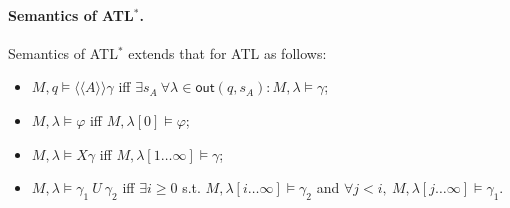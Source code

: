 \paragraph{Semantics of ATL$^\ast$.}
Semantics of ATL$^\ast$ extends that for ATL as follows: 
\begin{itemize}
  \item[-] $M,q \models \langle\!\langle A\rangle\!\rangle \gamma$ iff
        $\exists s_A \ \forall \lambda \in \mathsf{out}(q,s_A):
        M,\lambda \models \gamma$;
  \item[-] $M,\lambda \models \varphi$ iff $M,\lambda[0] \models \varphi$;
  \item[-] $M,\lambda \models X\gamma$ iff
        $M,\lambda[1 \dots \infty] \models \gamma$;
  \item[-] $M,\lambda \models \gamma_1 \ U \ \gamma_2$ iff
        $\exists i \ge 0$ s.t.
        $M,\lambda[i \dots \infty] \models \gamma_2$ and
        $\forall j < i,\ M,\lambda[j \dots \infty] \models \gamma_1$.
\end{itemize}




